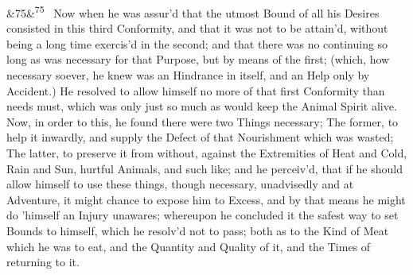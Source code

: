 \documentclass[12pt]{article}
\newcommand{\para}[1][]{\par\noindent\ifx&#1&\else\textsuperscript{\footnotesize #1}~\fi}
\begin{document}
\para[75] Now when he was assur'd that the utmost Bound of all his Desires consisted in this third Conformity, and that it was not to be attain'd, without being a long time exercis'd in the second; and that there was no continuing so long as was necessary for that Purpose, but by means of the first; (which, how necessary soever, he knew was an Hindrance in itself, and an Help only by Accident.) He resolved to allow himself no more of that first Conformity than needs must, which was only just so much as would keep the Animal Spirit alive. Now, in order to this, he found there were two Things necessary; The former, to help it inwardly, and supply the Defect of that Nourishment which was wasted; The latter, to preserve it from without, against the Extremities of Heat and Cold, Rain and Sun, hurtful Animals, and such like; and he perceiv'd, that if he should allow himself to use these things, though necessary, unadvisedly and at Adventure, it might chance to expose him to Excess, and by that means he might do 'himself an Injury unawares; whereupon he concluded it the safest way to set Bounds to himself, which he resolv'd not to pass; both as to the Kind of Meat which he was to eat, and the Quantity and Quality of it, and the Times of returning to it.
\end{document}
